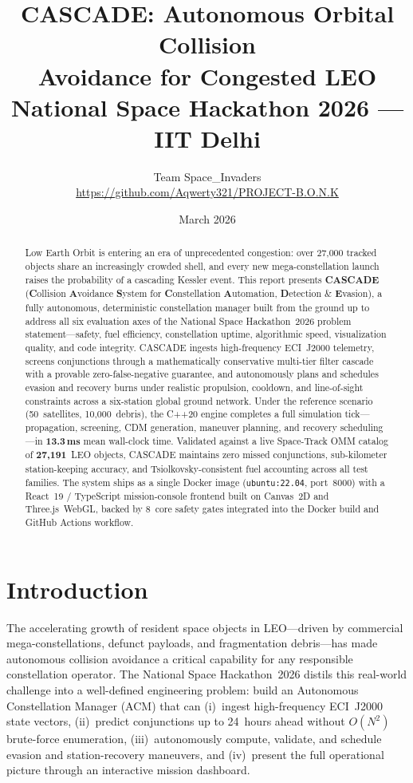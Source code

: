 \documentclass[10pt,twocolumn,letterpaper]{article}
\title{
  \vspace{-1.5em}
  {\LARGE\bfseries CASCADE: Autonomous Orbital Collision\\[2pt]
  Avoidance for Congested LEO}\\[6pt]
  {\normalsize National Space Hackathon 2026 --- IIT Delhi}
}
\author{
  Team Space\_Invaders\\[2pt]
  \small \url{https://github.com/Aqwerty321/PROJECT-B.O.N.K}
}
\date{March 2026}
\begin{document}
\maketitle
\thispagestyle{fancy}

\begin{abstract}
\noindent
Low Earth Orbit is entering an era of unprecedented congestion: over 27{,}000
tracked objects share an increasingly crowded shell, and every new
mega-constellation launch raises the probability of a cascading Kessler
event.  This report presents \textbf{CASCADE} (\textbf{C}ollision
\textbf{A}voidance \textbf{S}ystem for \textbf{C}onstellation
\textbf{A}utomation, \textbf{D}etection \& \textbf{E}vasion), a fully
autonomous, deterministic constellation manager built from the ground up to
address all six evaluation axes of the National Space Hackathon~2026 problem
statement---safety, fuel efficiency, constellation uptime, algorithmic
speed, visualization quality, and code integrity.  CASCADE ingests
high-frequency ECI~J2000 telemetry, screens conjunctions through a
mathematically conservative multi-tier filter cascade with a provable
zero-false-negative guarantee, and autonomously plans and schedules evasion
and recovery burns under realistic propulsion, cooldown, and
line-of-sight constraints across a six-station global ground network.
Under the reference scenario (50~satellites, 10{,}000~debris), the C++20
engine completes a full simulation tick---propagation, screening, CDM
generation, maneuver planning, and recovery scheduling---in
\textbf{13.3\,ms} mean wall-clock time.  Validated against a live
Space-Track OMM catalog of \textbf{27{,}191}~LEO objects, CASCADE maintains
zero missed conjunctions, sub-kilometer station-keeping accuracy, and
Tsiolkovsky-consistent fuel accounting across all test families.
The system ships as a single Docker image (\texttt{ubuntu:22.04},
port~8000) with a React~19 / TypeScript mission-console frontend built on
Canvas~2D and Three.js~WebGL, backed by 8~core safety gates integrated into
the Docker build and GitHub Actions workflow.
\end{abstract}

\section{Introduction}\label{sec:intro}

The accelerating growth of resident space objects in LEO---driven by
commercial mega-constellations, defunct payloads, and fragmentation
debris---has made autonomous collision avoidance a critical capability
for any responsible constellation operator.  The National Space
Hackathon~2026 distils this real-world challenge into a well-defined
engineering problem: build an Autonomous Constellation Manager (ACM) that
can (i)~ingest high-frequency ECI~J2000 state vectors, (ii)~predict
conjunctions up to 24~hours ahead without $O(N^{2})$ brute-force
enumeration, (iii)~autonomously compute, validate, and schedule evasion
and station-recovery maneuvers, and (iv)~present the full operational
picture through an interactive mission dashboard.
\end{document}
